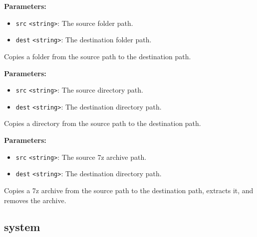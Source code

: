 \documentclass[12pt,a4paper]{article}
\begin{document}
\vspace{5mm}
\noindent {}


\noindent \textbf{Parameters:}
\begin{itemize}
  \item \texttt{src} \texttt{<string>}: The source folder path.
  \item \texttt{dest} \texttt{<string>}: The destination folder path.
\end{itemize}

\noindent Copies a folder from the source path to the destination path.

\vspace{5mm}
\noindent {}


\noindent \textbf{Parameters:}
\begin{itemize}
  \item \texttt{src} \texttt{<string>}: The source directory path.
  \item \texttt{dest} \texttt{<string>}: The destination directory path.
\end{itemize}

\noindent Copies a directory from the source path to the destination path.

\vspace{5mm}
\noindent {}


\noindent \textbf{Parameters:}
\begin{itemize}
  \item \texttt{src} \texttt{<string>}: The source 7z archive path.
  \item \texttt{dest} \texttt{<string>}: The destination directory path.
\end{itemize}

\noindent Copies a 7z archive from the source path to the destination path, extracts it, and removes the archive.


\subsection{system}
\vspace{5mm}
\noindent {}
\end{document}
